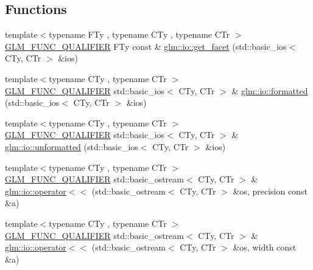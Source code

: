 \subsection*{Functions}
\begin{DoxyCompactItemize}
\item 
{\footnotesize template$<$typename F\+Ty , typename C\+Ty , typename C\+Tr $>$ }\\\hyperlink{setup_8hpp_a33fdea6f91c5f834105f7415e2a64407}{G\+L\+M\+\_\+\+F\+U\+N\+C\+\_\+\+Q\+U\+A\+L\+I\+F\+I\+ER} F\+Ty const  \& \hyperlink{namespaceglm_1_1io_a9e8927cf032254b0eee4ec650286e1f9}{glm\+::io\+::get\+\_\+facet} (std\+::basic\+\_\+ios$<$ C\+Ty, C\+Tr $>$ \&ios)
\item 
{\footnotesize template$<$typename C\+Ty , typename C\+Tr $>$ }\\\hyperlink{setup_8hpp_a33fdea6f91c5f834105f7415e2a64407}{G\+L\+M\+\_\+\+F\+U\+N\+C\+\_\+\+Q\+U\+A\+L\+I\+F\+I\+ER} std\+::basic\+\_\+ios$<$ C\+Ty, C\+Tr $>$ \& \hyperlink{namespaceglm_1_1io_a61bbd0ea648623b0b07215a986bd5aa5}{glm\+::io\+::formatted} (std\+::basic\+\_\+ios$<$ C\+Ty, C\+Tr $>$ \&ios)
\item 
{\footnotesize template$<$typename C\+Ty , typename C\+Tr $>$ }\\\hyperlink{setup_8hpp_a33fdea6f91c5f834105f7415e2a64407}{G\+L\+M\+\_\+\+F\+U\+N\+C\+\_\+\+Q\+U\+A\+L\+I\+F\+I\+ER} std\+::basic\+\_\+ios$<$ C\+Ty, C\+Tr $>$ \& \hyperlink{namespaceglm_1_1io_a833a8c96b3d84f7aa76e0c3e6845503e}{glm\+::io\+::unformatted} (std\+::basic\+\_\+ios$<$ C\+Ty, C\+Tr $>$ \&ios)
\item 
{\footnotesize template$<$typename C\+Ty , typename C\+Tr $>$ }\\\hyperlink{setup_8hpp_a33fdea6f91c5f834105f7415e2a64407}{G\+L\+M\+\_\+\+F\+U\+N\+C\+\_\+\+Q\+U\+A\+L\+I\+F\+I\+ER} std\+::basic\+\_\+ostream$<$ C\+Ty, C\+Tr $>$ \& \hyperlink{namespaceglm_1_1io_ac52a8c5f8ea189f5bae2e5b8e382675f}{glm\+::io\+::operator$<$$<$} (std\+::basic\+\_\+ostream$<$ C\+Ty, C\+Tr $>$ \&os, precision const \&a)
\item 
{\footnotesize template$<$typename C\+Ty , typename C\+Tr $>$ }\\\hyperlink{setup_8hpp_a33fdea6f91c5f834105f7415e2a64407}{G\+L\+M\+\_\+\+F\+U\+N\+C\+\_\+\+Q\+U\+A\+L\+I\+F\+I\+ER} std\+::basic\+\_\+ostream$<$ C\+Ty, C\+Tr $>$ \& \hyperlink{namespaceglm_1_1io_ac4783e4e3b0384619625d5d2d00c27b8}{glm\+::io\+::operator$<$$<$} (std\+::basic\+\_\+ostream$<$ C\+Ty, C\+Tr $>$ \&os, width const \&a)
\item 

\end{DoxyCompactItemize}
